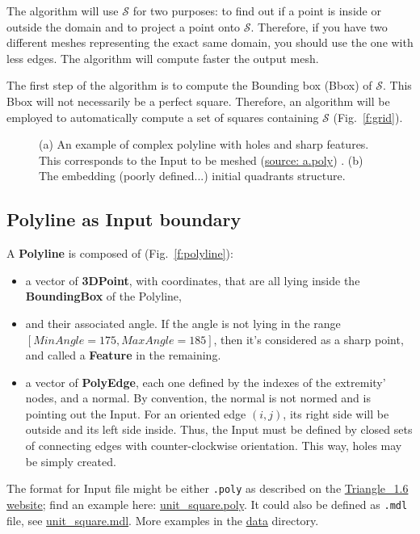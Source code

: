 \documentclass[10pt]{article}
\begin{document}
The algorithm will use $\mathcal{S}$ for two purposes: to find out if a point is inside or outside the domain and to project a point onto $\mathcal{S}$. Therefore, if you have two different meshes representing the exact same domain, you should use the one with less edges. The algorithm will compute faster the output mesh.

The first step of the algorithm is to compute the Bounding box (Bbox) of $\mathcal{S}$. This Bbox will not necessarily be a perfect square. Therefore, an algorithm will be employed to automatically compute a set of squares containing $\mathcal{S}$ (Fig.~\ref{f:grid}).

 \begin{figure}[htb]
\centering
\caption{ (a) An example of complex polyline with holes and sharp features. This corresponds to the Input to be meshed (\href{https://github.com/jaillet/MixedQuadTree/blob/master/data/a.poly}{source: a.poly}) . (b) The embedding (poorly defined...) initial quadrants structure. }
\label{fig:boundary}
\end{figure}

\subsection {Polyline as Input boundary}

A \textbf{Polyline} is composed of (Fig.~\ref{f:polyline}):
\begin{itemize}
\item a vector of  \textbf{3DPoint}, with coordinates, that are all lying inside the \textbf{BoundingBox} of the Polyline,
\item and their associated angle. If the angle is not lying in the range $[MinAngle=175,MaxAngle=185]$, then it's considered as a sharp point, and called  a \textbf{Feature} in the remaining.
\item a vector of \textbf{PolyEdge}, each one defined by the indexes of the extremity' nodes, and a normal. By convention, the normal is not normed and is pointing out the Input. For an oriented edge $(i,j)$, its right side will be outside and its left side inside. Thus, the Input must be defined by closed sets of connecting edges with counter-clockwise orientation. This way, holes may be simply created.
\end{itemize}
The format for Input file might be either \verb?.poly? as described on the \href{https://www.cs.cmu.edu/~quake/triangle.poly.html}{Triangle\_1.6 website}; find an example here: \href{https://github.com/jaillet/MixedQuadTree/blob/master/data/unit\_square.poly}{unit\_square.poly}.
It could also be defined as \verb?.mdl? file, see \href{https://github.com/jaillet/MixedQuadTree/blob/master/data/unit\_square.mdl}{unit\_square.mdl}. More examples in the \href{https://github.com/jaillet/MixedQuadTree/blob/master/data/}{data} directory.
\end{document}
